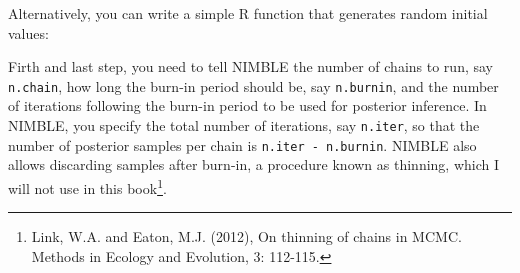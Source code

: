 \documentclass[
  12pt,
]{krantz}
\newenvironment{Shaded}{\begin{snugshade}}{\end{snugshade}}
\newcommand{\AttributeTok}[1]{\textcolor[rgb]{0.77,0.63,0.00}{#1}}
\newcommand{\ControlFlowTok}[1]{\textcolor[rgb]{0.13,0.29,0.53}{\textbf{#1}}}
\newcommand{\DecValTok}[1]{\textcolor[rgb]{0.00,0.00,0.81}{#1}}
\newcommand{\DocumentationTok}[1]{\textcolor[rgb]{0.56,0.35,0.01}{\textbf{\textit{#1}}}}
\newcommand{\FloatTok}[1]{\textcolor[rgb]{0.00,0.00,0.81}{#1}}
\newcommand{\FunctionTok}[1]{\textcolor[rgb]{0.00,0.00,0.00}{#1}}
\newcommand{\NormalTok}[1]{#1}
\newcommand{\OtherTok}[1]{\textcolor[rgb]{0.56,0.35,0.01}{#1}}
\begin{document}
\begin{Shaded}
\end{Shaded}

Alternatively, you can write a simple R function that generates random initial values:

\begin{Shaded}
\end{Shaded}

Firth and last step, you need to tell NIMBLE the number of chains to run, say \texttt{n.chain}, how long the burn-in period should be, say \texttt{n.burnin}, and the number of iterations following the burn-in period to be used for posterior inference. In NIMBLE, you specify the total number of iterations, say \texttt{n.iter}, so that the number of posterior samples per chain is \texttt{n.iter\ -\ n.burnin}. NIMBLE also allows discarding samples after burn-in, a procedure known as thinning, which I will not use in this book\footnote{Link, W.A. and Eaton, M.J. (2012), On thinning of chains in MCMC. Methods in Ecology and Evolution, 3: 112-115.}.
\end{document}
